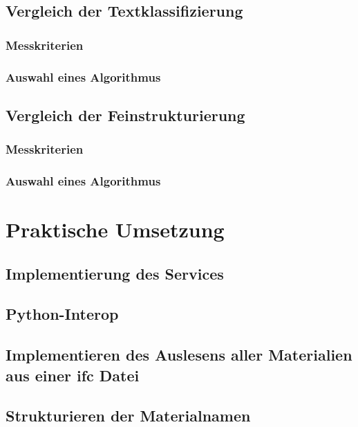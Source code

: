 \section{Vergleich der Textklassifizierung}
\label{c:comparison:classification}
\subsection{Messkriterien}
\label{c:comparison:classification:criteria}
\subsection{Auswahl eines Algorithmus}
\label{c:comparison:classification:selection}
\section{Vergleich der Feinstrukturierung}
\subsection{Messkriterien}
\label{c:comparison:fine-structuring:criteria}
\subsection{Auswahl eines Algorithmus}
\label{c:comparison:fine-structuring:selection}

\chapter{Praktische Umsetzung}
\label{c:implementation}
\section{Implementierung des Services}
\label{c:implementation:service}
\section{Python-Interop}
\label{c:implementation:python-interop}

\section{Implementieren des Auslesens aller Materialien aus einer \ac{ifc} Datei}
\label{c:implementation:ifc-material-extraction}

\section{Strukturieren der Materialnamen}
\label{c:implementation:structuring}
